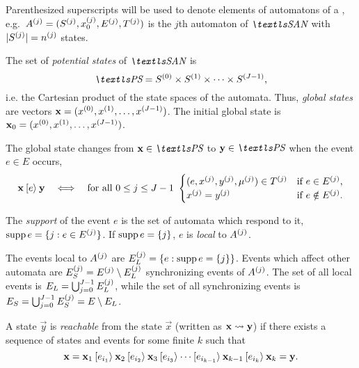 Parenthesized superscripts will be used to denote elements of
automatons of a ,
e.g.~$A^{(j)} = (S^{(j)}, x_0^{(j)}, E^{(j)}, T^{(j)})$
is the $j$th automaton of $\SAN$ with
$\lvert S^{(j)} \rvert = n^{(j)}$ states.

The set of \emph{potential states} of $\SAN$ is
\begin{equation}
  \PS = \loc{S}{0} \times \loc{S}{1} \times \cdots \times \loc{S}{J -
    1} \text,
\end{equation}
i.e. the Cartesian product of the state spaces of the automata. Thus,
\emph{global states} are vectors $\bm{\mathrm{x}} = (x^{(0)}, x^{(1)},
\ldots, x^{(J - 1)})$. The initial global state is $\bm{\mathrm{x}}_0 =
(x^{(0)}, x^{(1)}, \ldots, x^{(J - 1)})$.

\needspace{10ex}

The global state changes from $\vec{x} \in \PS$ to $\vec{y} \in \PS$
when the event $e \in E$ occurs,
\begin{equation}
  \label{eq:bakcground:san:transition}
  \bm{\mathrm{x}} \mathbin{[e\rangle} \bm{\mathrm{y}} \quad\Longleftrightarrow\quad
  \text{for all $0 \le j \le J - 1$ } \begin{cases}
    (e, x^{(j)}, y^{(j)}, \mu^{(j)}) \in T^{(j)}
    & \text{if $e \in E^{(j)}$,} \\
    x^{(j)} = y^{(j)} & \text{if $e \notin E^{(j)}$.}
  \end{cases}
\end{equation}

The \emph{support} of the event $e$ is the set of automata which
respond to it, $\operatorname{supp} e = \{ j : e \in E^{(j)} \}$. If $\operatorname{supp} e =
\{ j \}$, $e$ is \emph{local} to $A^{(j)}$.

The events local to $A^{(j)}$ are
$E_L^{(j)} = \{ e : \operatorname{supp} e = \{ j \}\}$. Events which affect other
automata are $E_S^{(j)} = E^{(j)} \setminus E_L^{(j)}$
synchronizing events of $A^{(j)}$. The set of all local events
is $E_L = \bigcup_{j = 0}^{J - 1} E_L^{(j)}$, while the set of all
synchronizing events is $E_S = \bigcup_{j = 0}^{J - 1} E_S^{(j)} =
E \setminus E_L$.

A state $\vec{y}$ is \emph{reachable} from the state $\vec{x}$
(written as $\bm{\mathrm{x}} \leadsto \bm{\mathrm{y}}$) if there exists a sequence of
states and events for some finite $k$ such that
\begin{equation}
  \bm{\mathrm{x}} = \bm{\mathrm{x}}_1 \mathbin{[e_{i_1}\rangle} \bm{\mathrm{x}}_2 \mathbin{[e_{i_2}\rangle}
  \bm{\mathrm{x}}_3 \mathbin{[e_{i_3}\rangle} \cdots \mathbin{[e_{i_{k - 1}}\rangle} \bm{\mathrm{x}}_{k
    - 1} \mathbin{[e_{i_k}\rangle} \bm{\mathrm{x}}_k = \bm{\mathrm{y}} \text.
\end{equation}

